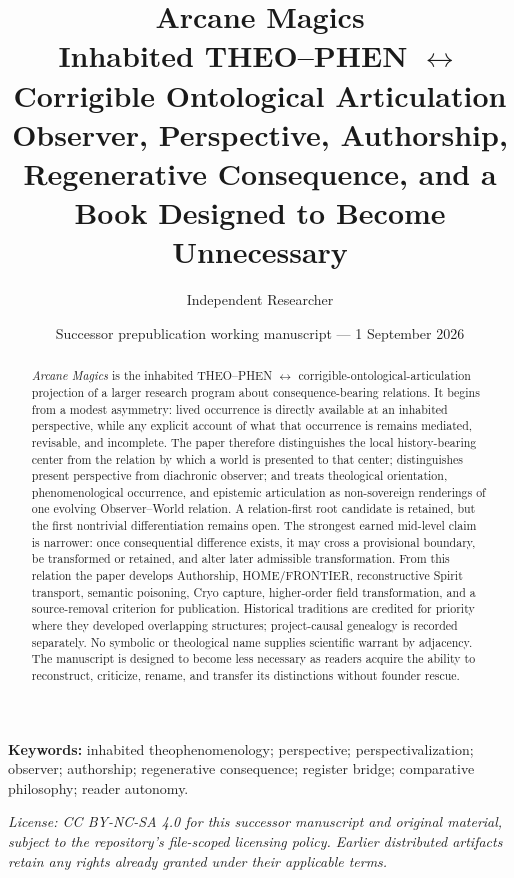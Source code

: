 \documentclass[11pt]{article}
\title{\textbf{Arcane Magics}\\
\large Inhabited THEO--PHEN $\leftrightarrow$ Corrigible Ontological Articulation\\
\normalsize Observer, Perspective, Authorship, Regenerative Consequence, and a Book Designed to Become Unnecessary}
\author{Independent Researcher}
\date{Successor prepublication working manuscript --- 1 September 2026}
\begin{document}
\maketitle

\begin{abstract}
\emph{Arcane Magics} is the inhabited THEO--PHEN $\leftrightarrow$ corrigible-ontological-articulation projection of a larger research program about consequence-bearing relations. It begins from a modest asymmetry: lived occurrence is directly available at an inhabited perspective, while any explicit account of what that occurrence is remains mediated, revisable, and incomplete. The paper therefore distinguishes the local history-bearing center from the relation by which a world is presented to that center; distinguishes present perspective from diachronic observer; and treats theological orientation, phenomenological occurrence, and epistemic articulation as non-sovereign renderings of one evolving Observer--World relation. A relation-first root candidate is retained, but the first nontrivial differentiation remains open. The strongest earned mid-level claim is narrower: once consequential difference exists, it may cross a provisional boundary, be transformed or retained, and alter later admissible transformation. From this relation the paper develops Authorship, HOME/FRONTIER, reconstructive Spirit transport, semantic poisoning, Cryo capture, higher-order field transformation, and a source-removal criterion for publication. Historical traditions are credited for priority where they developed overlapping structures; project-causal genealogy is recorded separately. No symbolic or theological name supplies scientific warrant by adjacency. The manuscript is designed to become less necessary as readers acquire the ability to reconstruct, criticize, rename, and transfer its distinctions without founder rescue.
\end{abstract}

\noindent\textbf{Keywords:} inhabited theophenomenology; perspective; perspectivalization; observer; authorship; regenerative consequence; register bridge; comparative philosophy; reader autonomy.

\medskip
\noindent\small\textit{License: CC BY-NC-SA 4.0 for this successor manuscript and original material, subject to the repository's file-scoped licensing policy. Earlier distributed artifacts retain any rights already granted under their applicable terms.}\normalsize

\tableofcontents
\newpage
\end{document}
